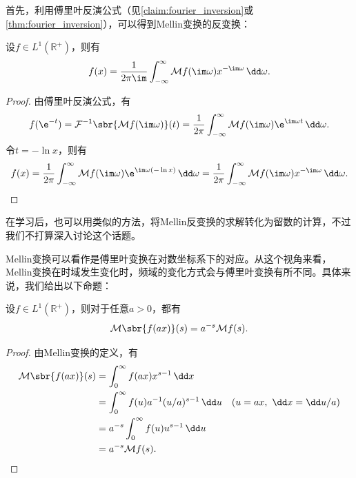 首先，利用傅里叶反演公式（见\cref{claim:fourier_inversion}或\cref{thm:fourier_inversion}），可以得到Mellin变换的反变换：
\begin{proposition}[Mellin反变换]
    设$f\in L^1(\mathbb{R}^+)$，则有
    \begin{equation}
        f(x)=\frac{1}{2\pi\im}\int_{-\infty}^{\infty}\mathcal{M}f(\im\omega)x^{-\im\omega}\,\dd\omega.
    \end{equation}
\end{proposition}
\begin{proof}
    由傅里叶反演公式，有
    \begin{equation}
        f(\e^{-t})=\mathcal{F}^{-1}\sbr{\mathcal{M}f(\im\omega)}(t)=\frac{1}{2\pi}\int_{-\infty}^{\infty}\mathcal{M}f(\im\omega)\e^{\im\omega t}\,\dd\omega.
    \end{equation}
    令$t=-\ln x$，则有
    \begin{equation}
        f(x)=\frac{1}{2\pi}\int_{-\infty}^{\infty}\mathcal{M}f(\im\omega)\e^{\im\omega(-\ln x)}\,\dd\omega=\frac{1}{2\pi}\int_{-\infty}^{\infty}\mathcal{M}f(\im\omega)x^{-\im\omega}\,\dd\omega.
    \end{equation}
\end{proof}

在学习后，也可以用类似的方法，将Mellin反变换的求解转化为留数的计算，不过我们不打算深入讨论这个话题。

Mellin变换可以看作是傅里叶变换在对数坐标系下的对应。从这个视角来看，Mellin变换在时域发生变化时，频域的变化方式会与傅里叶变换有所不同。具体来说，我们给出以下命题：
\begin{proposition}[Mellin变换的尺度变换性质]
    设$f\in L^1(\mathbb{R}^+)$，则对于任意$a>0$，都有
    \begin{equation}
        \mathcal{M}\sbr{f(ax)}(s)=a^{-s}\mathcal{M}f(s).
    \end{equation}
\end{proposition}
\begin{proof}
    由Mellin变换的定义，有
    \begin{align}
        \mathcal{M}\sbr{f(ax)}(s)&=\int_0^{\infty}f(ax)x^{s-1}\,\dd x\nonumber\\
        &=\int_0^{\infty}f(u)a^{-1}(u/a)^{s-1}\,\dd u\quad (u=ax,\ \dd x=\dd u/a)\nonumber\\
        &=a^{-s}\int_0^{\infty}f(u)u^{s-1}\,\dd u\nonumber\\
        &=a^{-s}\mathcal{M}f(s).
    \end{align}
\end{proof}

